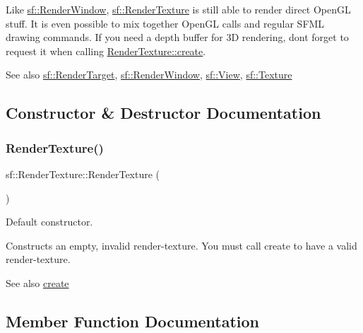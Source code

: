 Like \hyperlink{classsf_1_1_render_window}{sf\+::\+Render\+Window}, \hyperlink{classsf_1_1_render_texture}{sf\+::\+Render\+Texture} is still able to render direct Open\+GL stuff. It is even possible to mix together Open\+GL calls and regular S\+F\+ML drawing commands. If you need a depth buffer for 3D rendering, don\textquotesingle{}t forget to request it when calling \hyperlink{classsf_1_1_render_texture_aefbb76eb3b87e368ab974b2660931ccb}{Render\+Texture\+::create}.

\begin{DoxySeeAlso}{See also}
\hyperlink{classsf_1_1_render_target}{sf\+::\+Render\+Target}, \hyperlink{classsf_1_1_render_window}{sf\+::\+Render\+Window}, \hyperlink{classsf_1_1_view}{sf\+::\+View}, \hyperlink{classsf_1_1_texture}{sf\+::\+Texture} 
\end{DoxySeeAlso}


\subsection{Constructor \& Destructor Documentation}
\mbox{\label{classsf_1_1_render_texture_a19ee6e5b4c40ad251803389b3953a9c6}} 
\subsubsection{\texorpdfstring{Render\+Texture()}{RenderTexture()}}
{\footnotesize\ttfamily sf\+::\+Render\+Texture\+::\+Render\+Texture (\begin{DoxyParamCaption}{ }\end{DoxyParamCaption})}



Default constructor. 

Constructs an empty, invalid render-\/texture. You must call create to have a valid render-\/texture.

\begin{DoxySeeAlso}{See also}
\hyperlink{classsf_1_1_render_texture_aefbb76eb3b87e368ab974b2660931ccb}{create} 
\end{DoxySeeAlso}


\subsection{Member Function Documentation}
\mbox{\label{classsf_1_1_render_texture_aefbb76eb3b87e368ab974b2660931ccb}} 
